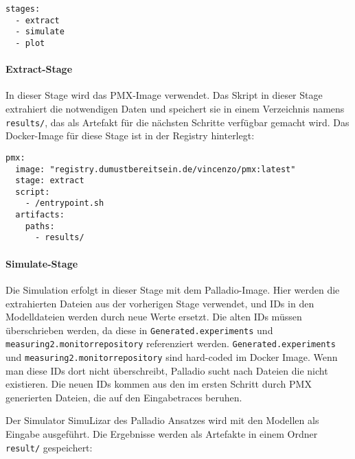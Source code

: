 \begin{verbatim}
stages:
  - extract
  - simulate
  - plot
\end{verbatim}

\paragraph*{Extract-Stage}
In dieser Stage wird das PMX-Image verwendet. Das Skript in dieser Stage extrahiert die notwendigen Daten und speichert sie in einem Verzeichnis namens \texttt{results/}, das als Artefakt für die nächsten Schritte verfügbar gemacht wird. Das Docker-Image für diese Stage ist in der Registry hinterlegt:

\begin{verbatim}
pmx:
  image: "registry.dumustbereitsein.de/vincenzo/pmx:latest"
  stage: extract
  script:
    - /entrypoint.sh
  artifacts:
    paths:
      - results/
\end{verbatim}

\paragraph*{Simulate-Stage}
Die Simulation erfolgt in dieser Stage mit dem Palladio-Image. Hier werden die extrahierten Dateien aus der vorherigen Stage verwendet, und IDs in den Modelldateien werden durch neue Werte ersetzt. Die alten IDs müssen überschrieben werden, da diese in \texttt{Generated.experiments} und \texttt{measuring2.monitorrepository} referenziert werden. \texttt{Generated.experiments} und \texttt{measuring2.monitorrepository} sind hard-coded im Docker Image. Wenn man diese IDs dort nicht überschreibt, Palladio sucht nach Dateien die nicht existieren. Die neuen IDs kommen aus den im ersten Schritt durch PMX generierten Dateien, die auf den Eingabetraces beruhen. 

Der Simulator SimuLizar des Palladio Ansatzes wird mit den Modellen als Eingabe ausgeführt. Die Ergebnisse werden als Artefakte in einem Ordner \texttt{result/} gespeichert:

